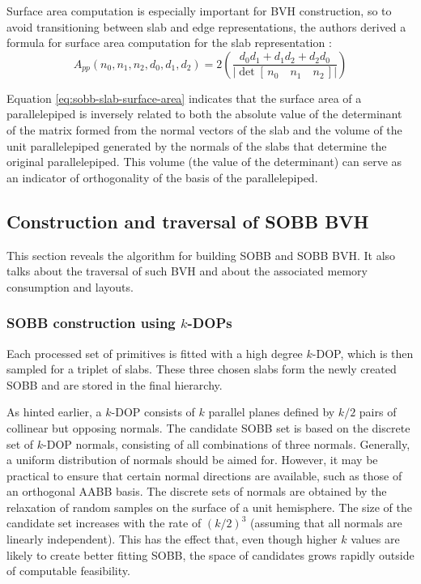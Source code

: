 Surface area computation is especially important for BVH construction, so to avoid transitioning between slab and edge representations, the authors derived a formula for surface area computation for the slab representation \cite{KB25}:
\begin{equation}
    A_{pp}(n_0, n_1, n_2, d_0, d_1, d_2)
    = 2 \left( \frac{d_0 d_1 + d_1 d_2 + d_2 d_0}{\left|\det\left[\,n_0 \quad n_1 \quad n_2\,\right]\right|} \right)
    \label{eq:sobb-slab-surface-area}
\end{equation}

Equation \ref{eq:sobb-slab-surface-area} indicates that the surface area of a parallelepiped is inversely related to both the absolute value of the determinant of the matrix formed from the normal vectors of the slab and the volume of the unit parallelepiped generated by the normals of the slabs that determine the original parallelepiped. This volume (the value of the determinant) can serve as an indicator of orthogonality of the basis of the parallelepiped. \cite{KB25}

\subsection{Construction and traversal of SOBB BVH}

This section reveals the algorithm for building SOBB and SOBB BVH. It also talks about the traversal of such BVH and about the associated memory consumption and layouts.

\subsubsection{SOBB construction using $k$-DOPs}

Each processed set of primitives is fitted with a high degree $k$-DOP, which is then sampled for a triplet of slabs. These three chosen slabs form the newly created SOBB and are stored in the final hierarchy. \cite{KB25}

As hinted earlier, a $k$-DOP consists of $k$ parallel planes defined by $k/2$ pairs of collinear but opposing normals. The candidate SOBB set is based on the discrete set of $k$-DOP normals, consisting of all combinations of three normals. Generally, a uniform distribution of normals should be aimed for. However, it may be practical to ensure that certain normal directions are available, such as those of an orthogonal AABB basis. The discrete sets of normals are obtained by the relaxation of random samples on the surface of a unit hemisphere. The size of the candidate set increases with the rate of $(k/2)^3$ (assuming that all normals are linearly independent). This has the effect that, even though higher $k$ values are likely to create better fitting SOBB, the space of candidates grows rapidly outside of computable feasibility. \cite{KB25}

